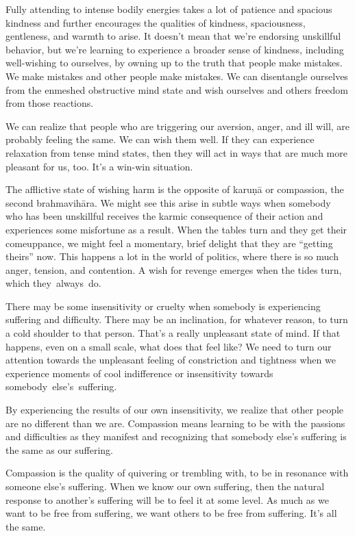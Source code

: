 Fully attending to intense bodily energies takes a lot of patience and spacious kindness and further encourages the qualities of kindness, spaciousness, gentleness, and warmth to arise. It doesn't mean that we're endorsing unskillful behavior, but we're learning to experience a broader sense of kindness, including well-wishing to ourselves, by owning up to the truth that people make mistakes. We make mistakes and other people make mistakes. We can disentangle ourselves from the enmeshed obstructive mind state and wish ourselves and others freedom from those reactions.

We can realize that people who are triggering our aversion, anger, and ill will, are probably feeling the same. We can wish them well. If they can experience relaxation from tense mind states, then they will act in ways that are much more pleasant for us, too. It's a win-win situation.

The afflictive state of wishing harm is the opposite of karuṇā or compassion, the second brahmavihāra. We might see this arise in subtle ways when somebody who has been unskillful receives the karmic consequence of their action and experiences some misfortune as a result. When the tables turn and they get their comeuppance, we might feel a momentary, brief delight that they are ``getting theirs'' now. This happens a lot in the world of politics, where there is so much anger, tension, and contention. A wish for revenge emerges when the tides turn, which \mbox{they always do.}

There may be some insensitivity or cruelty when somebody is experiencing suffering and difficulty. There may be an inclination, for whatever reason, to turn a cold shoulder to that person. That's a really unpleasant state of mind. If that happens, even on a small scale, what does that feel like? We need to turn our attention towards the unpleasant feeling of constriction and tightness when we experience moments of cool indifference or insensitivity towards \mbox{somebody else's suffering.}

By experiencing the results of our own insensitivity, we realize that other people are no different than we are. Compassion means learning to be with the passions and difficulties as they manifest and recognizing that somebody else's suffering is the same as our suffering.

Compassion is the quality of quivering or trembling with, to be in resonance with someone else's suffering. When we know our own suffering, then the natural response to another's suffering will be to feel it at some level. As much as we want to be free from suffering, we want others to be free from suffering. It's all the same.

